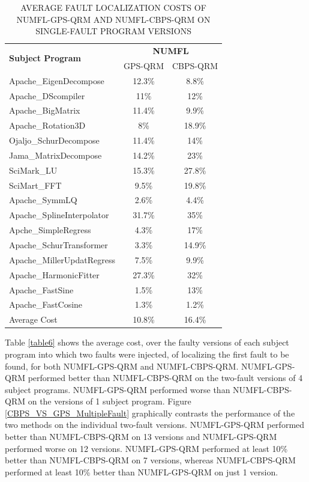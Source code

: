 \documentclass[times]{stvrauth}
\begin{document}
\begin{table}[htbp!]
\caption{AVERAGE FAULT LOCALIZATION COSTS OF NUMFL-GPS-QRM AND NUMFL-CBPS-QRM ON SINGLE-FAULT PROGRAM VERSIONS }
\label{table5}
\centering
      \begin{tabular}{|l|c|c|}
      \hline
\multirow{2}{*}{{\bf Subject Program}}	&	\multicolumn{2}{|c|}{{\bf NUMFL}}	\\	\cline{2-3}
&  GPS-QRM	&CBPS-QRM \\ \hline
Apache\_EigenDecompose	&	12.3\%	&	8.8\%	\\	\hline
Apache\_DScompiler	&	11\%	&	12\%	\\	\hline
Apache\_BigMatrix	&	11.4\%	&	9.9\%	\\	\hline
Apache\_Rotation3D	&	8\%	&	18.9\%	\\	\hline
Ojaljo\_SchurDecompose	&	11.4\%	&	14\%	\\	\hline
Jama\_MatrixDecompose	&	14.2\%	&	23\%	\\	\hline
SciMark\_LU	&	15.3\%	&	27.8\%	\\	\hline
SciMart\_FFT	&	9.5\%	&	19.8\%	\\	\hline
Apache\_SymmLQ	&	2.6\%	&	4.4\%	\\	\hline
Apache\_SplineInterpolator	&	31.7\%	&	35\%	\\	\hline
Apche\_SimpleRegress	&	4.3\%	&	17\%	\\	\hline
Apache\_SchurTransformer	&	3.3\%	&	14.9\%	\\	\hline
Apache\_MillerUpdatRegress	&	7.5\%	&	9.9\%	\\	\hline
Apache\_HarmonicFitter	&	27.3\%	&	32\%	\\	\hline
Apache\_FastSine	&	1.5\%	&	13\%	\\	\hline
Apache\_FastCosine	&	1.3\%	&	1.2\%	\\	\hline
Average Cost	&	10.8\%	&	16.4\%	\\	\hline
\end{tabular}
\end{table}

Table \ref{table6} shows the average cost, over the faulty versions of each subject program into which two faults were injected, of localizing the first fault to be found, for both NUMFL-GPS-QRM and NUMFL-CBPS-QRM.  NUMFL-GPS-QRM performed better than NUMFL-CBPS-QRM on the two-fault versions of 4 subject programs. NUMFL-GPS-QRM performed worse than NUMFL-CBPS-QRM on the versions of 1 subject program.  Figure \ref{CBPS_VS_GPS_MultipleFault} graphically contrasts the performance of the two methods on the individual two-fault versions.  NUMFL-GPS-QRM performed better than NUMFL-CBPS-QRM on 13 versions and NUMFL-GPS-QRM performed worse on 12 versions.  NUMFL-GPS-QRM performed at least 10\% better than NUMFL-CBPS-QRM on 7 versions, whereas NUMFL-CBPS-QRM performed at least 10\% better than NUMFL-GPS-QRM on just 1 version.
\end{document}
